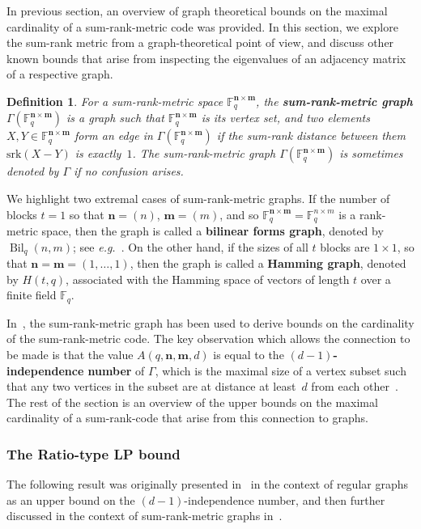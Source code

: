 \documentclass[a4paper]{article}
\newtheorem{definition}[formula]{Definition}
\newcommand{\F}{\mathbb{F}}
\newcommand{\Fq}{\F_q}
\newcommand{\Bil}{\operatorname{Bil}}
\newcommand{\bfn}{\mathbf {n}}
\newcommand{\bfm}{\mathbf {m}}
\newcommand{\spac}{\F^{\bfn\times\bfm}_q}
\newcommand{\srk}{\mathrm{srk}}
\begin{document}
In previous section, an overview of graph theoretical bounds on the maximal cardinality of a sum-rank-metric code was provided. In this section, we explore the sum-rank metric from a graph-theoretical point of view, and discuss other known bounds that arise from inspecting the eigenvalues of an adjacency matrix of a respective graph.

\begin{definition}\cite{byrne2022anticodes} For a sum-rank-metric space $\spac$, the \textbf{sum-rank-metric graph} $\Gamma(\spac)$ is a graph such that $\spac$ is its vertex set, and two elements $X,Y\in\spac$ form an edge in $\Gamma(\spac)$ if the sum-rank distance between them $\srk(X-Y)$ is exactly~$1$. The sum-rank-metric graph $\Gamma(\spac)$ is sometimes denoted by $\Gamma$ if no confusion arises.
\end{definition}

We highlight two extremal cases of sum-rank-metric graphs. If the number of blocks $t=1$ so that $\bfn = (n)$, $\bfm=(m)$, and so $\spac=\Fq^{n\times m}$ is a rank-metric space, then the graph is called a \textbf{bilinear forms graph}, denoted by $\Bil_q(n,m)$; see \emph{e.g.}~\cite{BCNbookDRG}. On the other hand, if the sizes of all $t$ blocks are $1\times1$, so that $\bfn=\bfm=(1,\dots,1)$, then the graph is called a \textbf{Hamming graph}, denoted by $H(t,q)$, associated with the Hamming space of vectors of length $t$ over a finite field $\Fq$.

In~\cite{AKR2024,AGKP2024,ART2025}, the sum-rank-metric graph has been used to derive bounds on the cardinality of the sum-rank-metric code. The key observation which allows the connection to be made is that the value $A(q,\bfn,\bfm,d)$ is equal to the \textbf{$(d-1)$-independence number} of $\Gamma$, which is the maximal size of a vertex subset such that any two vertices in the subset are at distance at least~$d$ from each other~\cite[Corollary 16]{AKR2024}. The rest of the section is an overview of the upper bounds on the maximal cardinality of a sum-rank-code that arise from this connection to graphs.


\subsubsection{The Ratio-type LP bound}\label{sec:RTboundLP}
The following result was originally presented in~\cite{ACF2019} in the context of regular graphs as an upper bound on the $(d-1)$-independence number, and then further discussed in the context of sum-rank-metric graphs in~\cite{AKR2024}.
\end{document}
